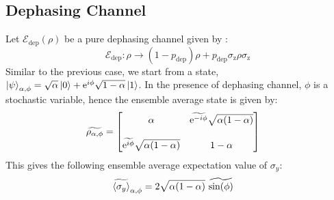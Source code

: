 \subsection{Dephasing Channel}
Let $\mathcal{E}_{\text{dep}}(\rho)$ be a pure dephasing channel given by \cite{Nielsen_Chuang_2010}:
\begin{equation}
    \mathcal{E}_{\text{dep}}:\rho\to (1-p_{\text{dep}})\rho + p_{\text{dep}}\sigma_{\text{z}}\rho\sigma_{\text{z}}
\end{equation}
Similar to the previous case, we start from a state, $\ket{\psi}_{\alpha,\phi} = \sqrt{\alpha}\ket{0} + \text{e}^{i\phi}\sqrt{1-\alpha}\ket{1}$. In the presence of dephasing channel, $\phi$ is a stochastic variable, hence the ensemble average state is given by:
\begin{align}
    \widetilde{\rho_{\alpha,\phi}} &= \begin{bmatrix} 
    \alpha & \widetilde{\text{e}^{-i\phi}}\sqrt{\alpha(1-\alpha)} \\\\
    \widetilde{\text{e}^{i\phi}}\sqrt{\alpha(1-\alpha)} & 1 -\alpha
\end{bmatrix}
\end{align}
This gives the following ensemble average expectation value of $\sigma_y$:
\begin{align}
\widetilde{\langle\sigma_{y}\rangle}_{\alpha,\phi} &= 2\sqrt{\alpha(1-\alpha)}~\widetilde{\text{sin}(\phi)}
\end{align}


